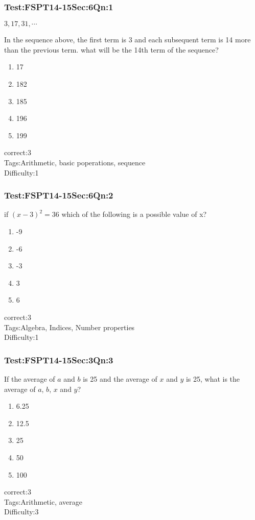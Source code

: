 \documentclass[]{beamer}
\begin{document}
    \begin{frame}
	    \frametitle{Test:FSPT14-15\hspace{2mm}Sec:6\hspace{2mm}Qn:1}
	\begin{center}
		$3,17,31,\cdots$
	\end{center}
	In the sequence above, the first term is 3 and each subsequent term is 14 more than the previous term. what will be the 14th term of the sequence? 	       
	    \begin{enumerate}
	        \item
	            17	
	        \item
	            182
	        \item
	            185
	        \item
	            196
	        \item
	            199
	    \end{enumerate}
	    correct:3  \\   
	    Tags:Arithmetic, basic poperations, sequence    \\
	    Difficulty:1   \\
    \end{frame}
    \begin{frame}
	    \frametitle{Test:FSPT14-15\hspace{2mm}Sec:6\hspace{2mm}Qn:2}
	if $(x-3)^2=36$ which of the following is a possible value of x?      
	    \begin{enumerate}
			\item
	        	-9        
	        \item
	            -6	
	        \item
	            -3
	        \item
	            3
	        \item
	            6    
	    \end{enumerate}
	    correct:3  \\   
	    Tags:Algebra, Indices, Number properties    \\
	    Difficulty:1   \\
    \end{frame}
    \begin{frame}
	    \frametitle{Test:FSPT14-15\hspace{2mm}Sec:3\hspace{2mm}Qn:3}
	 If the average of $a$ and $b$ is 25 and the average of $x$ and $y$ is 25, what is the average of $a$, $b$, $x$ and $y$?      
	    \begin{enumerate}
	        \item
	            6.25
	        \item
	            12.5
	        \item
	            25
	        \item
	            50
	        \item
	            100
	    \end{enumerate}
	    correct:3  \\   
	    Tags:Arithmetic, average    \\
	    Difficulty:3   \\
    \end{frame}
\end{document}
